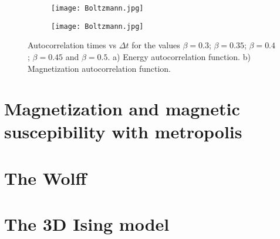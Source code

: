 \documentclass[11pt,a4paper]{article}
\begin{document}
\begin{figure}[h!]
\centering
\begin{subfigure}{.5\textwidth}
  \centering
  \texttt{[image: Boltzmann.jpg]}
  \caption{}
  \label{fig:autocorr_energy}
\end{subfigure}%
\begin{subfigure}{.5\textwidth}
  \centering
  \texttt{[image: Boltzmann.jpg]}
  \caption{}
  \label{fig:autocorr_mag}
\end{subfigure}
\caption{Autocorrelation times vs $\Delta t$ for the values $\beta = 0.3$; $\beta = 0.35$;
         $\beta = 0.4$; $\beta = 0.45$ and $\beta = 0.5$. a) Energy autocorrelation function. 
         b) Magnetization autocorrelation function.}
\label{fig:autocorr}
\end{figure}


\section{Magnetization and magnetic suscepibility with metropolis}

\section{The Wolff}

\section{The 3D Ising model}
\end{document}
